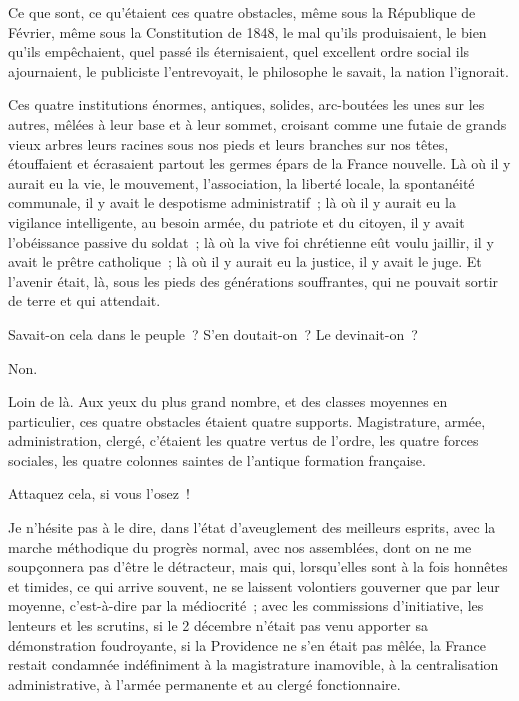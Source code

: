 \documentclass[french,twoside]{book} %
\begin{document}
\noindent Ce que sont, ce qu’étaient ces quatre obstacles, même sous la République de Février, même sous la Constitution de 1848, le mal qu’ils produisaient, le bien qu’ils empêchaient, quel passé ils éternisaient, quel excellent ordre social ils ajournaient, le publiciste l’entrevoyait, le philosophe le savait, la nation l’ignorait.\par
Ces quatre institutions énormes, antiques, solides, arc-boutées les unes sur les autres, mêlées à leur base et à leur sommet, croisant comme une futaie de grands vieux arbres leurs racines sous nos pieds et leurs branches sur nos têtes, étouffaient et écrasaient partout les germes épars de la France nouvelle. Là où il y aurait eu la vie, le mouvement, l’association, la liberté locale, la spontanéité communale, il y avait le despotisme administratif ; là où il y aurait eu la vigilance intelligente, au besoin armée, du patriote et du citoyen, il y avait l’obéissance passive du soldat ; là où la vive foi chrétienne eût voulu jaillir, il y avait le prêtre catholique ; là où il y aurait eu la justice, il y avait le juge. Et l’avenir était, là, sous les pieds des générations souffrantes, qui ne pouvait sortir de terre et qui attendait.\par
Savait-on cela dans le peuple ? S’en doutait-on ? Le devinait-on ?\par
Non.\par
Loin de là. Aux yeux du plus grand nombre, et des classes moyennes en particulier, ces quatre obstacles étaient quatre supports. Magistrature, armée, administration, clergé, c’étaient les quatre vertus de l’ordre, les quatre forces sociales, les quatre colonnes saintes de l’antique formation française.\par
Attaquez cela, si vous l’osez !\par
Je n’hésite pas à le dire, dans l’état d’aveuglement des meilleurs esprits, avec la marche méthodique du progrès normal, avec nos assemblées, dont on ne me soupçonnera pas d’être le détracteur, mais qui, lorsqu’elles sont à la fois honnêtes et timides, ce qui arrive souvent, ne se laissent volontiers gouverner que par leur moyenne, c’est-à-dire par la médiocrité ; avec les commissions d’initiative, les lenteurs et les scrutins, si le 2 décembre n’était pas venu apporter sa démonstration foudroyante, si la Providence ne s’en était pas mêlée, la France restait condamnée indéfiniment à la magistrature inamovible, à la centralisation administrative, à l’armée permanente et au clergé fonctionnaire.\par
\end{document}
